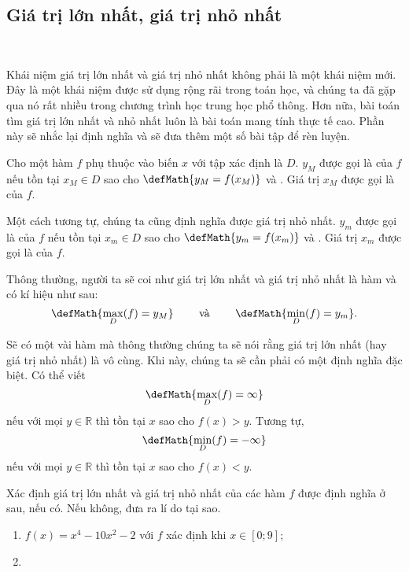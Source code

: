 \subsection{Giá trị lớn nhất, giá trị nhỏ nhất}

\ %

Khái niệm giá trị lớn nhất và giá trị nhỏ nhất không phải là một khái niệm mới. Đây là một khái niệm được sử dụng rộng rãi trong toán học, và chúng ta đã gặp qua nó rất nhiều trong chương trình học trung học phổ thông. Hơn nữa, bài toán tìm giá trị lớn nhất và nhỏ nhất luôn là bài toán mang tính thực tế cao. Phần này sẽ nhắc lại định nghĩa và sẽ đưa thêm một số bài tập để rèn luyện.

Cho một hàm $f$ phụ thuộc vào biến $x$ với tập xác định là $D$. $y_M$ được gọi là  của $f$ nếu tồn tại $x_M \in D$ sao cho $\defMath{y_M = f(x_M)}$ và . Giá trị $x_M$ được gọi là  của $f$. 

Một cách tương tự, chúng ta cũng định nghĩa được giá trị nhỏ nhất. $y_m$ được gọi là  của $f$ nếu tồn tại $x_m \in D$ sao cho $\defMath{y_m = f(x_m)}$ và . Giá trị $x_m$ được gọi là  của $f$.

Thông thường, người ta sẽ coi như giá trị lớn nhất và giá trị nhỏ nhất là hàm và có kí hiệu như sau:
$$
\defMath{\max_{D} (f) = y_M}
\qquad \text{ và } \qquad
\defMath{\min_{D} (f) = y_m}.
$$

Sẽ có một vài hàm mà thông thường chúng ta sẽ nói rằng giá trị lớn nhất (hay giá trị nhỏ nhất) là vô cùng. Khi này, chúng ta sẽ cần phải có một định nghĩa đặc biệt. Có thể viết $$\defMath{\max_{D} (f) = \infty}$$ nếu với mọi $y \in \mathbb{R}$ thì tồn tại $x$ sao cho $f(x) > y$. Tương tự, $$\defMath{\min_{D} (f) = -\infty}$$ nếu với mọi $y \in \mathbb{R}$ thì tồn tại $x$ sao cho $f(x) < y$.

\exercise Xác định giá trị lớn nhất và giá trị nhỏ nhất của các hàm $f$ được định nghĩa ở sau, nếu có. Nếu không, đưa ra lí do tại sao.
\begin{enumerate}
   \item $f(x) = x^4 - 10x^2 - 2$ với $f$ xác định khi $x \in \left[0;9\right]$;
   \item 
\end{enumerate}